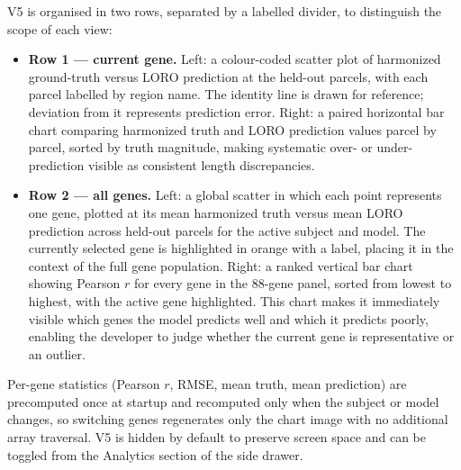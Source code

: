 \documentclass[11pt,letterpaper]{article}
\begin{document}
V5 is organised in two rows, separated by a labelled divider, to distinguish
the scope of each view:

\begin{itemize}[nosep]
  \item \textbf{Row 1 — current gene.}
        Left: a colour-coded scatter plot of harmonized ground-truth versus
        LORO prediction at the held-out parcels, with each parcel labelled by
        region name.
        The identity line is drawn for reference; deviation from it represents
        prediction error.
        Right: a paired horizontal bar chart comparing harmonized truth and LORO
        prediction values parcel by parcel, sorted by truth magnitude, making
        systematic over- or under-prediction visible as consistent length
        discrepancies.

  \item \textbf{Row 2 — all genes.}
        Left: a global scatter in which each point represents one gene, plotted
        at its mean harmonized truth versus mean LORO prediction across held-out
        parcels for the active subject and model.
        The currently selected gene is highlighted in orange with a label,
        placing it in the context of the full gene population.
        Right: a ranked vertical bar chart showing Pearson $r$ for every gene in
        the 88-gene panel, sorted from lowest to highest, with the active gene
        highlighted.
        This chart makes it immediately visible which genes the model predicts
        well and which it predicts poorly, enabling the developer to judge
        whether the current gene is representative or an outlier.
\end{itemize}

Per-gene statistics (Pearson $r$, RMSE, mean truth, mean prediction) are
precomputed once at startup and recomputed only when the subject or model
changes, so switching genes regenerates only the chart image with no
additional array traversal.
V5 is hidden by default to preserve screen space and can be toggled from
the Analytics section of the side drawer.
\end{document}
